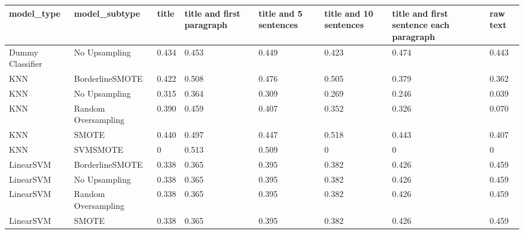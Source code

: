 \begin{tabular}{llllllll}
\toprule
                  model\_type &       model\_subtype & title & title and first paragraph & title and 5 sentences & title and 10 sentences & title and first sentence each paragraph &  raw text \\
\midrule
            Dummy Classifier &       No Upsampling & 0.434 &                     0.453 &                 0.449 &                  0.423 &                                   0.474 &     0.443 \\
                         KNN &     BorderlineSMOTE & 0.422 &                     0.508 &                 0.476 &                  0.505 &                                   0.379 &     0.362 \\
                         KNN &       No Upsampling & 0.315 &                     0.364 &                 0.309 &                  0.269 &                                   0.246 &     0.039 \\
                         KNN & Random Oversampling & 0.390 &                     0.459 &                 0.407 &                  0.352 &                                   0.326 &     0.070 \\
                         KNN &               SMOTE & 0.440 &                     0.497 &                 0.447 &                  0.518 &                                   0.443 &     0.407 \\
                         KNN &            SVMSMOTE &     0 &                     0.513 &                 0.509 &                      0 &                                       0 &         0 \\
                   LinearSVM &     BorderlineSMOTE & 0.338 &                     0.365 &                 0.395 &                  0.382 &                                   0.426 &     0.459 \\
                   LinearSVM &       No Upsampling & 0.338 &                     0.365 &                 0.395 &                  0.382 &                                   0.426 &     0.459 \\
                   LinearSVM & Random Oversampling & 0.338 &                     0.365 &                 0.395 &                  0.382 &                                   0.426 &     0.459 \\
                   LinearSVM &               SMOTE & 0.338 &                     0.365 &                 0.395 &                  0.382 &                                   0.426 &     0.459 \\

\end{tabular}
